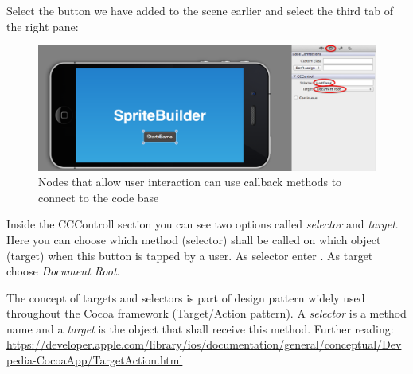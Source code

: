 \begin{leftbar}
Select the button we have added to the scene earlier and
select the third tab of the right pane:

\begin{figure}[H]
		\centering
		\includegraphics[width=0.9\linewidth]{images/firstproject/button_callback.png}
		\caption{Nodes that allow user interaction can use callback methods to
		connect to the code base}
\end{figure}

Inside the CCControll section you can see two options called \textit{selector}
and \textit{target}. Here you can choose which method (selector) shall be
called on which object (target) when this button is tapped by a user. As
selector enter . As target choose \textit{Document Root}.
\end{leftbar}

\begin{details} \label{target_selector}
The concept of targets and selectors is part of design pattern widely used
throughout the Cocoa framework (Target/Action pattern). A \textit{selector} is
a method name and a \textit{target} is the object that shall receive this method.
Further reading:
\url{https://developer.apple.com/library/ios/documentation/general/conceptual/Devpedia-CocoaApp/TargetAction.html}
\end{details}

